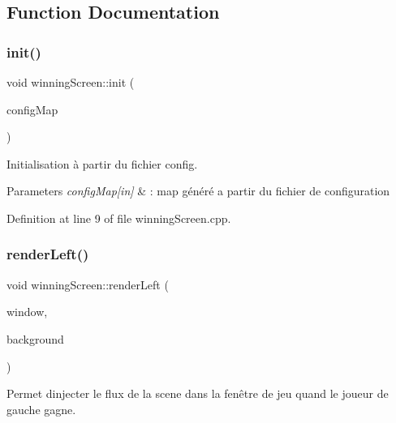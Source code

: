 \subsection{Function Documentation}
\mbox{\label{namespacewinning_screen_a95cf45487b70c59a93914ac096314d8b}} 
\subsubsection{\texorpdfstring{init()}{init()}}
{\footnotesize\ttfamily void winning\+Screen\+::init (\begin{DoxyParamCaption}\item[{std\+::map$<$ std\+::string, std\+::string $>$ \&}]{config\+Map }\end{DoxyParamCaption})}



Initialisation à partir du fichier config. 


\begin{DoxyParams}{Parameters}
{\em config\+Map\mbox{[}in\mbox{]}} & \+: map généré a partir du fichier de configuration \\
\hline
\end{DoxyParams}


Definition at line 9 of file winning\+Screen.\+cpp.

\mbox{\label{namespacewinning_screen_a191b2df2e95ec566a104e99436ceac14}} 
\subsubsection{\texorpdfstring{render\+Left()}{renderLeft()}}
{\footnotesize\ttfamily void winning\+Screen\+::render\+Left (\begin{DoxyParamCaption}\item[{\hyperlink{class_min_g_l}{Min\+GL} \&}]{window,  }\item[{\hyperlink{classns_gui_1_1_sprite}{ns\+Gui\+::\+Sprite} \&}]{background }\end{DoxyParamCaption})}



Permet d\textquotesingle{}injecter le flux de la scene dans la fenêtre de jeu quand le joueur de gauche gagne. 



